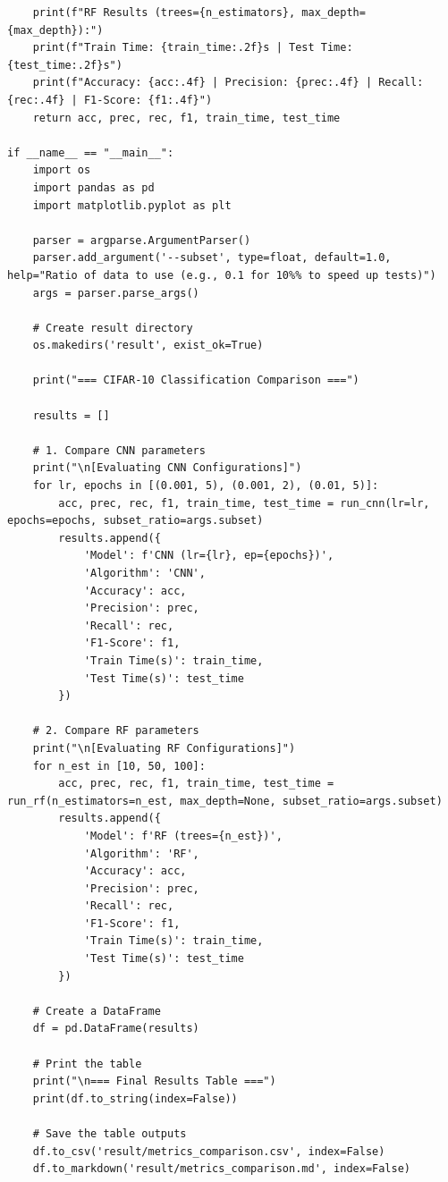 \documentclass[runningheads]{ctexart}
\begin{document}
\begin{lstlisting}
    print(f"RF Results (trees={n_estimators}, max_depth={max_depth}):")
    print(f"Train Time: {train_time:.2f}s | Test Time: {test_time:.2f}s")
    print(f"Accuracy: {acc:.4f} | Precision: {prec:.4f} | Recall: {rec:.4f} | F1-Score: {f1:.4f}")
    return acc, prec, rec, f1, train_time, test_time

if __name__ == "__main__":
    import os
    import pandas as pd
    import matplotlib.pyplot as plt

    parser = argparse.ArgumentParser()
    parser.add_argument('--subset', type=float, default=1.0, help="Ratio of data to use (e.g., 0.1 for 10%% to speed up tests)")
    args = parser.parse_args()

    # Create result directory
    os.makedirs('result', exist_ok=True)

    print("=== CIFAR-10 Classification Comparison ===")
    
    results = []

    # 1. Compare CNN parameters
    print("\n[Evaluating CNN Configurations]")
    for lr, epochs in [(0.001, 5), (0.001, 2), (0.01, 5)]:
        acc, prec, rec, f1, train_time, test_time = run_cnn(lr=lr, epochs=epochs, subset_ratio=args.subset)
        results.append({
            'Model': f'CNN (lr={lr}, ep={epochs})',
            'Algorithm': 'CNN',
            'Accuracy': acc,
            'Precision': prec,
            'Recall': rec,
            'F1-Score': f1,
            'Train Time(s)': train_time,
            'Test Time(s)': test_time
        })
    
    # 2. Compare RF parameters
    print("\n[Evaluating RF Configurations]")
    for n_est in [10, 50, 100]:
        acc, prec, rec, f1, train_time, test_time = run_rf(n_estimators=n_est, max_depth=None, subset_ratio=args.subset)
        results.append({
            'Model': f'RF (trees={n_est})',
            'Algorithm': 'RF',
            'Accuracy': acc,
            'Precision': prec,
            'Recall': rec,
            'F1-Score': f1,
            'Train Time(s)': train_time,
            'Test Time(s)': test_time
        })
        
    # Create a DataFrame
    df = pd.DataFrame(results)
    
    # Print the table
    print("\n=== Final Results Table ===")
    print(df.to_string(index=False))
    
    # Save the table outputs
    df.to_csv('result/metrics_comparison.csv', index=False)
    df.to_markdown('result/metrics_comparison.md', index=False)
    

\end{lstlisting}
\end{document}
